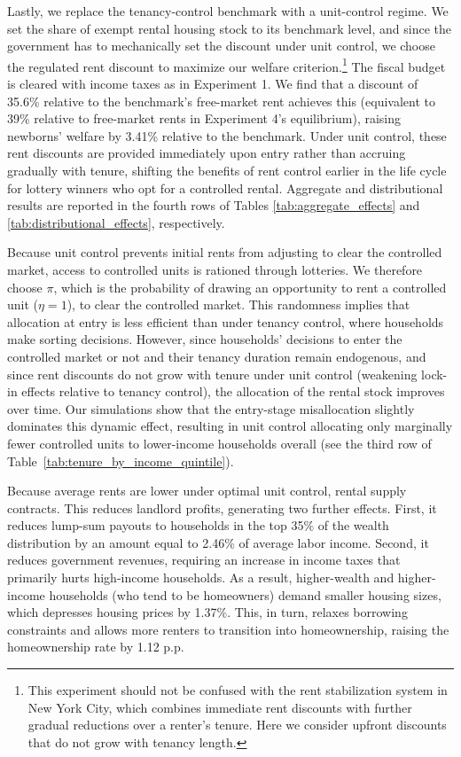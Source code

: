 \documentclass[parskip=full]{article}
\begin{document}
Lastly, we replace the tenancy-control benchmark with a unit-control regime. We set the share of exempt rental housing stock to its benchmark level, and since the government has to mechanically set the discount under unit control, we choose the regulated rent discount to maximize our welfare criterion.\footnote{This experiment should not be confused with the rent stabilization system in New York City, which combines immediate rent discounts with further gradual reductions over a renter's tenure. Here we consider upfront discounts that do not grow with tenancy length.} The fiscal budget is cleared with income taxes as in Experiment 1. We find that a discount of 35.6\% relative to the benchmark's free-market rent achieves this (equivalent to 39\% relative to free-market rents in Experiment 4's equilibrium), raising newborns' welfare by 3.41\% relative to the benchmark. Under unit control, these rent discounts are provided immediately upon entry rather than accruing gradually with tenure, shifting the benefits of rent control earlier in the life cycle for lottery winners who opt for a controlled rental. Aggregate and distributional results are reported in the fourth rows of Tables \ref{tab:aggregate_effects} and \ref{tab:distributional_effects}, respectively.

Because unit control prevents initial rents from adjusting to clear the controlled market, access to controlled units is rationed through lotteries. We therefore choose $\pi$, which is the probability of drawing an opportunity to rent a controlled unit ($\eta=1$), to clear the controlled market. This randomness implies that allocation at entry is less efficient than under tenancy control, where households make sorting decisions. However, since households' decisions to enter the controlled market or not and their tenancy duration remain endogenous, and since rent discounts do not grow with tenure under unit control (weakening lock-in effects relative to tenancy control), the allocation of the rental stock improves over time. Our simulations show that the entry-stage misallocation slightly dominates this dynamic effect, resulting in unit control allocating only marginally fewer controlled units to lower-income households overall (see the third row of Table~\ref{tab:tenure_by_income_quintile}).

Because average rents are lower under optimal unit control, rental supply contracts. This reduces landlord profits, generating two further effects. First, it reduces lump-sum payouts to households in the top 35\% of the wealth distribution by an amount equal to 2.46\% of average labor income. Second, it reduces government revenues, requiring an increase in income taxes that primarily hurts high-income households. As a result, higher-wealth and higher-income households (who tend to be homeowners) demand smaller housing sizes, which depresses housing prices by 1.37\%. This, in turn, relaxes borrowing constraints and allows more renters to transition into homeownership, raising the homeownership rate by 1.12 p.p.
\end{document}
